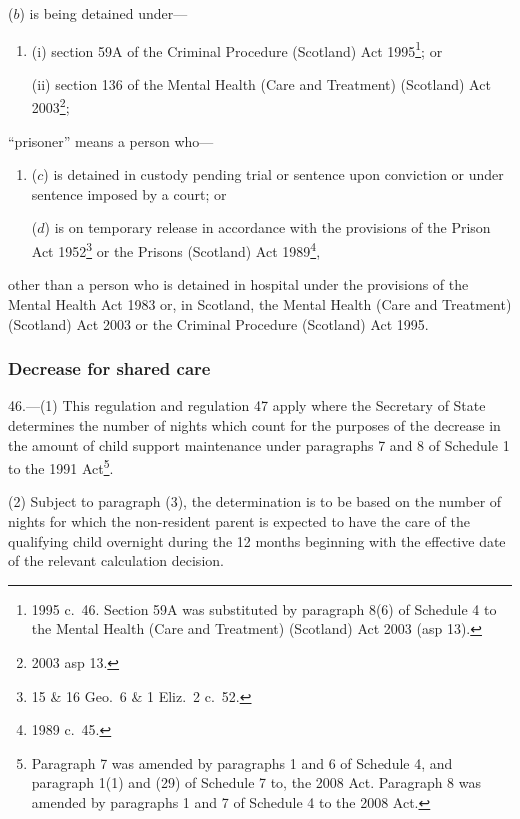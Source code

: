 \documentclass[12pt,a4paper]{article}
\begin{document}
\begin{enumerate}
\begin{enumerate}
($b$) 
is being detained under—
\begin{enumerate}\item[]
(i) 
section 59A of the Criminal Procedure (Scotland) Act 1995\footnote{1995 c.~46. Section 59A was substituted by paragraph 8(6) of Schedule 4 to the Mental Health (Care and Treatment) (Scotland) Act 2003 (asp 13).}; or

(ii) 
section 136 of the Mental Health (Care and Treatment) (Scotland) Act 2003\footnote{2003 asp 13.};
\end{enumerate}
\end{enumerate}

“prisoner” means a person who—
\begin{enumerate}\item[]
($c$) 
is detained in custody pending trial or sentence upon conviction or under sentence imposed by a court; or

($d$) 
is on temporary release in accordance with the provisions of the Prison Act 1952\footnote{15 \& 16 Geo.~6 \& 1 Eliz.~2 c.~52.} or the Prisons (Scotland) Act 1989\footnote{1989 c.~45.},
\end{enumerate}
other than a person who is detained in hospital under the provisions of the Mental Health Act 1983 or, in Scotland, the Mental Health (Care and Treatment) (Scotland) Act 2003 or the Criminal Procedure (Scotland) Act 1995.
\end{enumerate}


\subsubsection[46. Decrease for shared care]{Decrease for shared care}

46.---(1)  This regulation and regulation 47 apply where the Secretary of State determines the number of nights which count for the purposes of the decrease in the amount of child support maintenance under paragraphs 7 and 8 of Schedule 1 to the 1991 Act\footnote{Paragraph 7 was amended by paragraphs 1 and 6 of Schedule 4, and paragraph 1(1) and (29) of Schedule 7 to, the 2008 Act. Paragraph 8 was amended by paragraphs 1 and 7 of Schedule 4 to the 2008 Act.}.

(2) Subject to paragraph (3), the determination is to be based on the number of nights for which the non-resident parent is expected to have the care of the qualifying child overnight during the 12 months beginning with the effective date of the relevant calculation decision.
\end{document}
